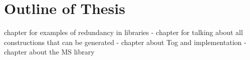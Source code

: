 

\section{Outline of Thesis}
chapter for examples of redundancy in libraries - 
chapter for talking about all constructions that can be generated - 
chapter about Tog and implementation - 
chapter about the MS library  

